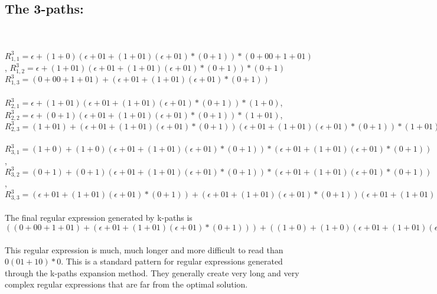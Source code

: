 \documentclass{article}%
\begin{document}
\subsection{The 3-paths:}\\
\\
$R_{1,1}^3 = \epsilon + (1 + 0)(\epsilon + 01 + (1 + 01)(\epsilon + 01)*(0 + 1))*(0 + 00 + 1 + 01)$,
$R_{1,2}^3 = \epsilon + (1 + 01)(\epsilon + 01 + (1 + 01)(\epsilon + 01)*(0 + 1))*(0 + 1)$
$R_{1,3}^3 = (0 + 00 + 1 + 01) + (\epsilon + 01 + (1 + 01)(\epsilon + 01)*(0 + 1))$\\
\\
$R_{2,1}^3 = \epsilon + (1 + 01)(\epsilon + 01 + (1 + 01)(\epsilon + 01)*(0 + 1))*(1 + 0)$,
$R_{2,2}^3 = \epsilon + (0 + 1)(\epsilon + 01 + (1 + 01)(\epsilon + 01)*(0 + 1))*(1 + 01)$,
$R_{2,3}^3 = (1 + 01) + (\epsilon + 01 + (1 + 01)(\epsilon + 01)*(0 + 1))(\epsilon + 01 + (1 + 01)(\epsilon + 01)*(0 + 1))*(1 + 01)$\\
\\
$R_{3,1}^3 = (1 + 0) + (1 + 0)(\epsilon + 01 + (1 + 01)(\epsilon + 01)*(0 + 1))*(\epsilon + 01 + (1 + 01)(\epsilon + 01)*(0 + 1))$,
$R_{3,2}^3 = (0 + 1) + (0 + 1)(\epsilon + 01 + (1 + 01)(\epsilon + 01)*(0 + 1))*(\epsilon + 01 + (1 + 01)(\epsilon + 01)*(0 + 1))$,
$R_{3,3}^3 = (\epsilon + 01 + (1 + 01)(\epsilon + 01)*(0 + 1)) + (\epsilon + 01 + (1 + 01)(\epsilon + 01)*(0 + 1))(\epsilon + 01 + (1 + 01)
(\epsilon + 01)*(0 + 1))*(\epsilon + 01 + (1 + 01)(\epsilon + 01)*(0 + 1))$\\
\\
The final regular expression generated by k-paths is $((0 + 00 + 1 + 01) + (\epsilon + 01 + (1 + 01)(\epsilon + 01)*(0 + 1))) + ((1 + 0) + (1 + 0)(\epsilon + 01 + (1 + 01)(\epsilon + 01)*(0 + 1))*(\epsilon + 01 + (1 + 01)(\epsilon + 01)*(0 + 1)))$\\
\\
This regular expression is much, much longer and more difficult to read than $0(01 + 10)*0$. This is a standard pattern for regular
expressions generated through the k-paths expansion method. They generally create very long and very complex regular expressions
that are far from the optimal solution.
\end{document}

